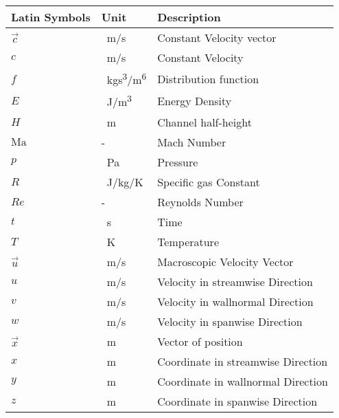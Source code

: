 
\begin{tabular}{p{5cm}p{4cm}p{5cm}}
Latin Symbols & Unit       & Description      \\ \hline
    $\vec{c}$               & \SI{}{m/s}    & Constant Velocity vector \\
    $c$                     & \SI{}{m/s}    & Constant Velocity \\
    $f$						& \SI{}{kgs^3/m^6} & Distribution function\\
    $E$                     & \SI{}{J/m^3}  & Energy Density \\
    $H$                     & \SI{}{m}      & Channel half-height \\
    $\mathrm{Ma}$			&	- 			& Mach Number \\
    $p$                     & \SI{}{Pa}     & Pressure \\
    $R$                     & \SI{}{J/kg/K} & Specific gas Constant \\
    $\mathit{Re}$           &  -            & Reynolds Number \\
    $t$                     & \SI{}{s}      & Time  \\
    $T$                     & \SI{}{K}      & Temperature \\
    $\vec{u}$               & \SI{}{m/s}    & Macroscopic Velocity Vector\\
    $u$                     & \SI{}{m/s}    & Velocity in \newline streamwise Direction \\
    $v$                     & \SI{}{m/s}    & Velocity in \newline wallnormal Direction \\    
    $w$                     & \SI{}{m/s}    & Velocity in \newline spanwise Direction \\
    $\vec{x}$               & \SI{}{m}      & Vector of position \\
    $x$                     & \SI{}{m}      & Coordinate in  \newline streamwise Direction \\
    $y$                     & \SI{}{m}      & Coordinate in \newline wallnormal Direction \\
    $z$                     & \SI{}{m}      & Coordinate in \newline spanwise Direction
\end{tabular}
\vspace{0.5cm}

